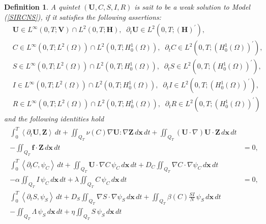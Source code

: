 \documentclass[10pt,number,preprint,times]{elsarticle}
\numberwithin{equation}{section} %
\newtheorem{defi}{Definition}[section]
\begin{document}
	
	\begin{defi}\label{defSol} A quintet  $(\boldsymbol{U},C,S,I,R)$ is sait to be a weak solution to Model (\ref{SIRCNS}), if it satisfies the following assertions: 
		\begin{equation*}
			\begin{split}
				& \boldsymbol{U} \in L^\infty(0,T; \mathbf{V})\cap L^2(0,T; \mathbf{H}),\;\;\partial_t \boldsymbol{U} \in L^2(0,T;(\mathbf{H})^\prime),
				\\
				&C \in L^\infty(0,T; L^2(\Omega))\cap L^2(0,T;  H^{1}_{0}(\Omega)),\;\;\partial_t C\in L^2(0,T;( H^{1}_{0}(\Omega))^\prime), 
				\\
				&S \in  L^\infty(0,T; L^2(\Omega))\cap L^2(0,T;  H^{1}_{0}(\Omega)),\;\;\partial_t S\in L^2(0,T;( H^{1}_{0}(\Omega))^\prime), 
				\\
				&I \in  L^\infty(0,T; L^2(\Omega))\cap L^2(0,T;  H^{1}_{0}(\Omega)),\;\;\partial_t I\in L^2(0,T;( H^{1}_{0}(\Omega))^\prime),
				\\
				&R \in  L^\infty(0,T; L^2(\Omega))\cap L^2(0,T;  H^{1}_{0}(\Omega)),\;\;\partial_t R\in L^2(0,T;( H^{1}_{0}(\Omega))^\prime)
			\end{split}
		\end{equation*}
		and the following identities hold
		\begin{eqnarray}\label{eqvar1}
			\begin{split}
				\int_{0}^{T}		\left\langle\partial_t\boldsymbol{U}, \boldsymbol{Z}\right\rangle\, dt+\iint_{Q_T}	\nu(C) \nabla \boldsymbol{U} : \nabla \boldsymbol{Z}\, d\mathbf{x}\, dt+\iint_{Q_T}	(\boldsymbol{U}\cdot\nabla)\boldsymbol{U} \cdot  \boldsymbol{Z}\, d\mathbf{x}\, dt\\
				-\iint_{Q_T}\boldsymbol{f}\cdot \boldsymbol{Z}\, d\mathbf{x}\, dt&=0,
				\\  
				\int_{0}^{T}	\left\langle\partial_tC, \psi_C \right\rangle\, dt+ \iint_{Q_T}  \boldsymbol{U}\cdot\nabla C\, \psi_C\, d\mathbf{x}\, dt+ D_C\iint_{Q_T}\nabla C \cdot\nabla \psi_C\, d\mathbf{x}\, dt\\ - \alpha\iint_{Q_T} I\, \psi_C\, d\mathbf{x}\, dt + \lambda \iint_{Q_T} C \,\psi_C \, d\mathbf{x}\, dt
				&=0,
				\\ 	  		
				\int_{0}^{T}	\left\langle\partial_t S, \psi_S \right\rangle\, dt+ D_S\iint_{Q_T}\nabla S \cdot\nabla \psi_S\, d\mathbf{x}\, dt+\iint_{Q_T}\beta(C) \frac{SI}{N} \, \psi_S\, d\mathbf{x}\, dt\\-\iint_{Q_T} \Lambda \,\psi_S \, d\mathbf{x}\, dt + \eta \iint_{Q_T} S \,\psi_S \, d\mathbf{x}\, dt

\end{split}
\end{eqnarray}
\end{defi}
\end{document}
